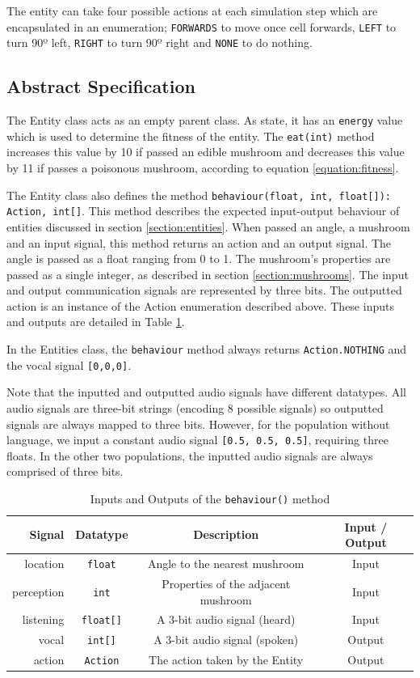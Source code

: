 \documentclass[12pt,a4paper,twoside,openright]{report}
\begin{document}
The entity can take four possible actions at each simulation step which are encapsulated in an enumeration; \texttt{FORWARDS} to move once cell forwards, \texttt{LEFT} to turn 90º left, \texttt{RIGHT} to turn 90º right and \texttt{NONE} to do nothing.

\subsection{Abstract Specification}

The Entity class acts as an empty parent class. As state, it has an \texttt{energy} value which is used to determine the fitness of the entity. The \texttt{eat(int)} method increases this value by 10 if passed an edible mushroom and decreases this value by 11 if passes a poisonous mushroom, according to equation \ref{equation:fitness}. 

The Entity class also defines the method \texttt{behaviour(float, int, float[]): Action, int[]}. This method describes the expected input-output behaviour of entities discussed in section \ref{section:entities}. When passed an angle, a mushroom and an input signal, this method returns an action and an output signal. The angle is passed as a float ranging from 0 to 1. The mushroom's properties are passed as a single integer, as described in section \ref{section:mushrooms}. The input and output communication signals are represented by three bits. The outputted action is an instance of the Action enumeration described above. These inputs and outputs are detailed in Table \ref{table:behaviour}. 

In the Entities class, the \texttt{behaviour} method always returns \texttt{Action.NOTHING} and the vocal signal \texttt{[0,0,0]}.

Note that the inputted and outputted audio signals have different datatypes. All audio signals are three-bit strings (encoding 8 possible signals) so outputted signals are always mapped to three bits. However, for the population without language, we input a constant audio signal \texttt{[0.5, 0.5, 0.5]}, requiring three floats. In the other two populations, the inputted audio signals are always comprised of three bits.

\begin{table}[t]
\centering
 \begin{tabular}{ r | c | c | c}
 \bf{Signal} & \bf{Datatype} & \bf{Description} & \bf{Input / Output} \\ [0.5ex] 
 \hline
location & \texttt{float} & Angle to the nearest mushroom & Input \\
perception & \texttt{int} & Properties of the adjacent mushroom & Input \\
listening & \texttt{float[]} & A 3-bit audio signal (heard) & Input \\
vocal & \texttt{int[]} & A 3-bit audio signal (spoken) & Output \\
action & \texttt{Action} & The action taken by the Entity & Output \\
\end{tabular}
\caption{Inputs and Outputs of the \texttt{behaviour()} method}
\label{table:behaviour}
\end{table}
\end{document}

